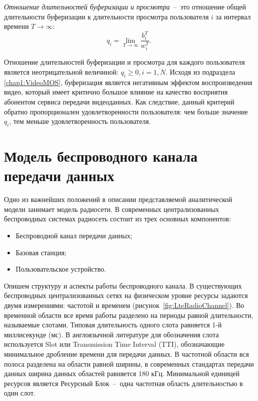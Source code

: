 \begin{definition}
\label{def:BWTR}
    \emph{Отношение длительностей буферизации и просмотра}~--~это отношение общей длительности буферизации к длительности просмотра пользователя $i$ за интервал времени $T\rightarrow\infty$:
    $$q_i = \lim\limits_{T\rightarrow\infty} \frac{b_i^T}{w_i^T}.$$
\end{definition}

Отношение длительностей буферизации и просмотра для каждого пользователя является неотрицательной величиной: $q_i \geq 0, i=\overline{1,N}.$ Исходя из подраздела \ref{chap1:VideoMOS}, буферизация является негативным эффектом воспроизведения видео, который имеет критично большое влияние на качество восприятия абонентом сервиса передачи видеоданных. Как следствие, данный критерий обратно пропорционален удовлетворенности пользователя: чем больше значение $q_i$, тем меньше удовлетворенность пользователя.

\section{Модель беспроводного канала передачи данных}
\label{chap2:RadioChannel}

Одно из важнейших положений в описании представляемой аналитической модели занимает модель радиосети. В современных централизованных беспроводных системах радиосеть состоит из трех основных компонентов:
\begin{itemize}
	\item Беспроводной канал передачи данных;
	\item Базовая станция;
	\item Пользовательское устройство.
\end{itemize}

Опишем структуру и аспекты работы беспроводного канала. В существующих беспроводных централизованных сетях на физическом уровне ресурсы задаются двумя измерениями: частотой и временем (рисунок~\ref{fig:LteRadioChannel}). Во временной области все время работы разделено на периоды равной длительности, называемые слотами. Типовая длительность одного слота равняется 1-й миллисекунде (мс). В англоязычной литературе для обозначения слота используется Slot или Transmission Time Interval (TTI), обозначающие минимальное дробление времени для передачи данных. В частотной области вся полоса разделена на области равной ширины, в современных стандартах передачи данных ширина данных областей равняется 180 кГц. Минимальной единицей ресурсов является Ресурсный Блок~--~одна частотная область длительностью в один слот.


